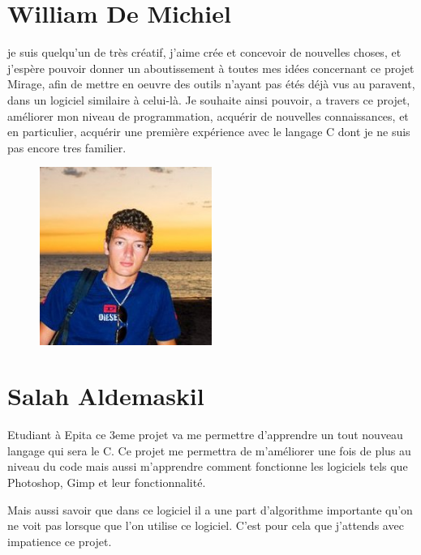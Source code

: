 \documentclass[12pt, a4paper]{report}
\begin{document}
\newpage

\section{William De Michiel}

je suis quelqu'un de très créatif, j'aime crée et concevoir de nouvelles choses, et j'espère pouvoir donner un aboutissement à toutes mes idées concernant ce projet Mirage, afin de mettre en oeuvre des outils n'ayant pas étés déjà vus au paravent, dans un logiciel similaire à celui-là. Je souhaite ainsi pouvoir, a travers ce projet, améliorer mon niveau de programmation, acquérir de nouvelles connaissances, et en particulier, acquérir une première expérience avec le langage C dont je ne suis pas encore tres familier.

\begin{figure}[!h]
\begin{center} \includegraphics[width=0.5\textwidth]{images/wili.jpg} \end{center}
\end{figure}

\newpage

\section{Salah Aldemaskil}

Etudiant à Epita ce 3eme projet va me permettre d’apprendre un tout nouveau langage qui sera le C. Ce projet me permettra de m’améliorer une fois de plus au niveau du code mais aussi m’apprendre comment fonctionne les logiciels tels que Photoshop, Gimp et leur fonctionnalité. 
\par Mais aussi savoir que dans ce logiciel il a une part d’algorithme importante qu’on ne voit pas lorsque que l’on utilise ce logiciel. C’est pour cela que j’attends avec impatience ce projet.
\end{document}
